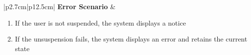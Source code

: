 \begin{table}[H]
\begin{tabular}{|p{2.7cm}|p{12.5cm}|}
        \textbf{Error Scenario} & \begin{minipage}[t]{\linewidth}
                                      \begin{enumerate}[topsep=0pt,itemsep=1pt,parsep=0pt,partopsep=0pt]
                                          \item If the user is not suspended, the system displays a notice
                                          \item If the unsuspension fails, the system displays an error and retains the current
                                                state
                                      \end{enumerate}
                                  \end{minipage} \\
        \hline
    \end{tabular}
    \label{tab:admin-unsuspend-user}
\end{table}
